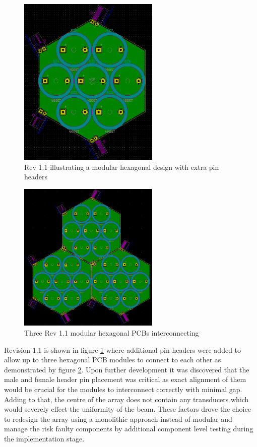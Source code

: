 \begin{figure}[ht!]
    \centering
    \includegraphics[width=0.6\textwidth]{Figures/Design/PCB/closeups/hexrev1.1.png}
    \caption{Rev 1.1 illustrating a modular hexagonal design with extra pin headers}
    \label{fig:modHex1.1}
\end{figure}

\begin{figure}[ht!]
    \centering
    \includegraphics[width=0.6\textwidth]{Figures/Design/PCB/closeups/3xhex1.1.png}
    \caption{Three Rev 1.1 modular hexagonal PCBs interconnecting}
    \label{fig:3modHex1.1}
\end{figure}


Revision 1.1 is shown in figure \ref{fig:modHex1.1} where additional pin headers were added to allow up to three hexagonal PCB modules to connect to each other as demonstrated by figure \ref{fig:3modHex1.1}. Upon further development it was discovered that the male and female header pin placement was critical as exact alignment of them would be crucial for the modules to interconnect correctly with minimal gap. Adding to that, the centre of the array does not contain any transducers which would severely effect the uniformity of the beam. These factors drove the choice to redesign the array using a monolithic approach instead of modular and manage the risk faulty components by additional component level testing during the implementation stage.


